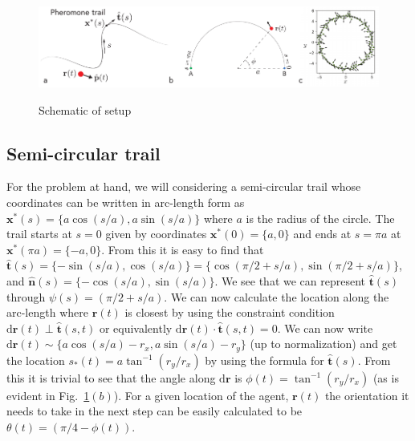 \documentclass[12pt]{article}
\def\d{\text{d}}
\def\r{\mathbf{r}}
\def\xst{\mathbf{x}^*}
\def\th{\hat{\mathbf{t}}}
\def\nh{\hat{\mathbf{n}}}
\begin{document}
\begin{figure}
    \centering
    \includegraphics[width=\textwidth]{./figs/schematic.pdf}\label{fig:schm1}
    \caption{Schematic of setup}
\end{figure}

\subsection{Semi-circular trail}
For the problem at hand, we will considering a semi-circular trail whose coordinates can be
written in arc-length form as $\xst(s) = \{ a \cos(s/a), a \sin(s/a) \}$ where $a$ is the radius
of the circle. The trail starts at $s=0$ given by coordinates $\xst(0) = \{ a, 0 \}$ and ends at
$s=\pi a$ at $\xst (\pi a) = \{ -a, 0 \}$. From this it is easy to find that $\th(s) = \{ -\sin(s/a) , \cos(s/a) \}
= \{ \cos(\pi/2 + s/a), \sin(\pi/2 + s/a) \}$, and $\nh(s) = \{ -\cos(s/a) , \sin(s/a) \}$. We see that we
can represent $\th(s)$ through $\psi(s) = (\pi/2 + s/a)$. We can now calculate the location along the arc-length
where $\r(t)$ is closest by using the constraint condition $\d\r(t) \perp \th(s,t)$ or equivalently $\d\r(t)
\cdot \th(s,t) = 0$. We can now write $\d \r(t) \sim \{ a \cos(s/a) - r_x, a \sin(s/a) - r_y \}$
(up to normalization) and get the location $s_*(t) = a \tan^{-1}(r_y/r_x)$ by using the formula
for $\th(s)$. From this it is trivial to see that the angle along $\d \r$ is $\phi(t) = \tan^{-1}(r_y/r_x)$
(as is evident in Fig.~\ref{fig:schm1}$(b)$). For a given location of the agent, $\r(t)$ the orientation
it needs to take in the next step can be easily calculated to be $\theta(t) = (\pi/4 - \phi(t))$.
\end{document}

